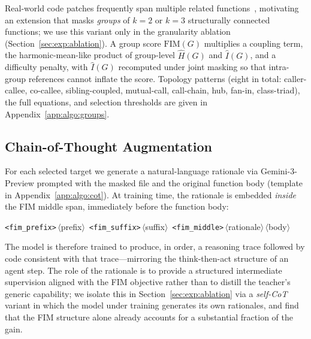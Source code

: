 Real-world code patches frequently span multiple related
functions~\citep{swebench}, motivating an extension that masks
\emph{groups} of $k=2$ or $k=3$ structurally connected functions; we use
this variant only in the granularity ablation
(Section~\ref{sec:exp:ablation}). A group score $\mathrm{FIM}(G)$
multiplies a coupling term, the harmonic-mean-like product of
group-level $\hat{H}(G)$ and $\hat{I}(G)$, and a difficulty penalty,
with $\hat{I}(G)$ recomputed under joint masking so that intra-group
references cannot inflate the score. Topology patterns (eight in total:
caller-callee, co-callee, sibling-coupled, mutual-call, call-chain, hub,
fan-in, class-triad), the full equations, and selection thresholds are
given in Appendix~\ref{app:algo:groups}.

\subsection{Chain-of-Thought Augmentation}
\label{sec:method:cot}

For each selected target we generate a natural-language rationale via
Gemini-3-Preview prompted with the masked file and the original function
body (template in Appendix~\ref{app:algo:cot}). At training time, the
rationale is embedded \emph{inside} the FIM middle span, immediately
before the function body:
%
\begin{center}\small
\texttt{<fim\_prefix>}\,$\langle$prefix$\rangle$\,%
\texttt{<fim\_suffix>}\,$\langle$suffix$\rangle$\,%
\texttt{<fim\_middle>}\,$\langle$rationale$\rangle$\,$\langle$body$\rangle$
\end{center}
%
The model is therefore trained to produce, in order, a reasoning trace
followed by code consistent with that trace---mirroring the
think-then-act structure of an agent step. The role of the rationale is
to provide a structured intermediate supervision aligned with the FIM
objective rather than to distill the teacher's generic capability; we
isolate this in Section~\ref{sec:exp:ablation} via a \emph{self-CoT}
variant in which the model under training generates its own rationales,
and find that the FIM structure alone already accounts for a substantial
fraction of the gain.